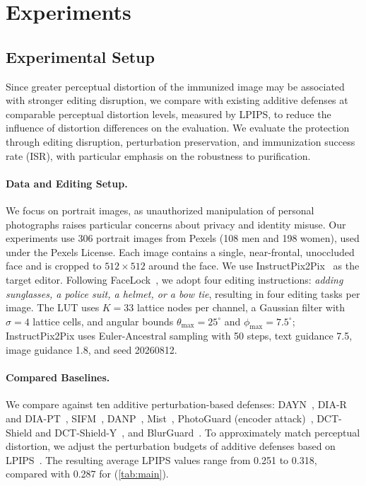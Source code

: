 \section{Experiments}
\label{sec:exp}

\subsection{Experimental Setup}
Since greater perceptual distortion of the immunized image may be associated with stronger editing disruption, we compare \capg{} with existing additive defenses at comparable perceptual distortion levels, measured by LPIPS, to reduce the influence of distortion differences on the evaluation. We evaluate the protection through editing disruption, perturbation preservation, and immunization success rate (ISR), with particular emphasis on the robustness to purification.

\paragraph{Data and Editing Setup.}
\label{sec:exp_setup}
We focus on portrait images, as unauthorized manipulation of personal photographs raises particular concerns about privacy and identity misuse. Our experiments use 306 portrait images from Pexels (108 men and 198 women), used under the Pexels License. Each image contains a single, near-frontal, unoccluded face and is cropped to $512\times512$ around the face. We use InstructPix2Pix~\cite{brooks2023instructpix2pix} as the target editor. Following FaceLock~\cite{wang2025facelock}, we adopt four editing instructions: \textit{adding sunglasses, a police suit, a helmet, or a bow tie}, resulting in four editing tasks per image. The LUT uses $K = 33$ lattice nodes per channel, a Gaussian filter with $\sigma = 4$ lattice cells, and angular bounds $\theta_{\max} = 25^\circ$ and $\phi_{\max} = 7.5^\circ$; InstructPix2Pix uses Euler-Ancestral sampling with 50 steps, text guidance 7.5, image guidance 1.8, and seed 20260812.

\paragraph{Compared Baselines.}
We compare \capg{} against ten additive perturbation-based defenses: DAYN~\cite{lo2024dayn}, DIA-R and DIA-PT~\cite{dia2025}, SIFM~\cite{dong2025sifm}, DANP~\cite{zhang2025danp}, Mist~\cite{liang2023mist}, PhotoGuard (encoder attack)~\cite{salman2023photoguard}, DCT-Shield and DCT-Shield-Y~\cite{dctshield2025}, and BlurGuard~\cite{blurguard2025}. To approximately match perceptual distortion, we adjust the perturbation budgets of additive defenses based on LPIPS~\cite{zhang2018lpips}. The resulting average LPIPS values range from 0.251 to 0.318, compared with 0.287 for \capg{} (\cref{tab:main}).

